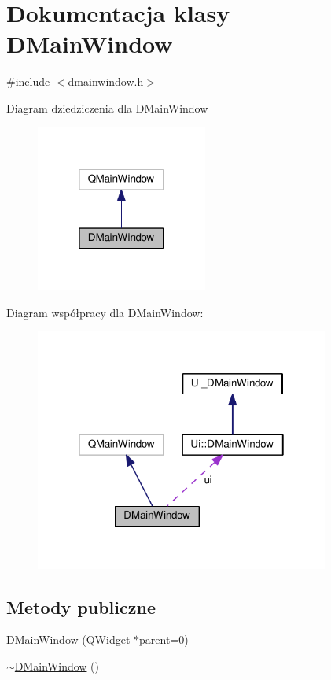\hypertarget{class_d_main_window}{\section{Dokumentacja klasy D\-Main\-Window}
\label{class_d_main_window}
}


{\ttfamily \#include $<$dmainwindow.\-h$>$}



Diagram dziedziczenia dla D\-Main\-Window
\nopagebreak
\begin{figure}[H]
\begin{center}
\leavevmode
\includegraphics[width=160pt]{class_d_main_window__inherit__graph}
\end{center}
\end{figure}


Diagram współpracy dla D\-Main\-Window\-:
\nopagebreak
\begin{figure}[H]
\begin{center}
\leavevmode
\includegraphics[width=274pt]{class_d_main_window__coll__graph}
\end{center}
\end{figure}
\subsection*{Metody publiczne}
\begin{DoxyCompactItemize}
\item 
\hyperlink{class_d_main_window_a5eb52e50cb0f15345279e161eed68389}{D\-Main\-Window} (Q\-Widget $\ast$parent=0)
\item 
\hyperlink{class_d_main_window_acca34964f553e9e18371434ad8dc171c}{$\sim$\-D\-Main\-Window} ()
\end{DoxyCompactItemize}
